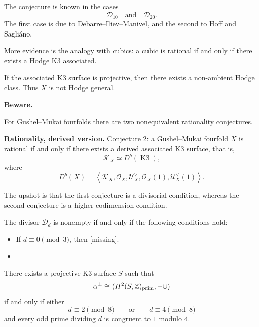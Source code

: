 The conjecture is known in the cases
\[
        \mathcal D_{10}
        \quad\text{and}\quad
        \mathcal D_{20}.
\]
The first case is due to
Debarre--Iliev--Manivel, and the
second to Hoff and Sagli\'ano.

More evidence is the analogy with cubics:
a cubic is rational if and only if
there exists a Hodge K3 associated.

\begin{remark}
\label{remark-associated-k3}
If the associated K3 surface is
projective, then there exists a
non-ambient Hodge class.
Thus $X$ is not Hodge general.
\end{remark}

\medskip\noindent
{\bf Beware.}

For Gushel--Mukai fourfolds there are
two nonequivalent rationality
conjectures.

\begin{remark}
\label{remark-rationality}
{\bf Rationality, derived version.}
Conjecture 2: 
a Gushel--Mukai fourfold $X$ is
rational if and only if there exists
a derived associated K3 surface, that
is,
\[
        \mathcal K_X\simeq
        D^b(\operatorname{K3}),
\]
where
\[
        D^b(X)
        =
        \left\langle{}
        \mathcal K_X,
        \mathcal O_X,
        \mathcal U_X^\vee,
        \mathcal O_X(1),
        \mathcal U_X^\vee(1)
        \right\rangle{} .
\]
\end{remark}

The upshot is that the first
conjecture is a divisorial condition,
whereas the second conjecture is a
higher-codimension condition.

\begin{theorem}
\label{theorem-divisor-d}
The divisor $\mathcal D_d$ is nonempty
if and only if the following
conditions hold:
\begin{itemize}
\item If $d\equiv 0\pmod 3$, then
[missing].
\item [missing]
\end{itemize}
\end{theorem}

\begin{theorem}
\label{theorem-k3-surface2}
There exists a projective K3 surface
$S$ such that
\[
        \alpha^\perp
        \cong
        (H^2(S,\mathbb{Z})_{\rm prim},
        -\cup)
\]
if and only if either
\[
        d\equiv 2\pmod 8
        \qquad\text{or}\qquad
        d\equiv 4\pmod 8
\]
and every odd prime dividing $d$ is
congruent to $1$ modulo $4$.
\end{theorem}

